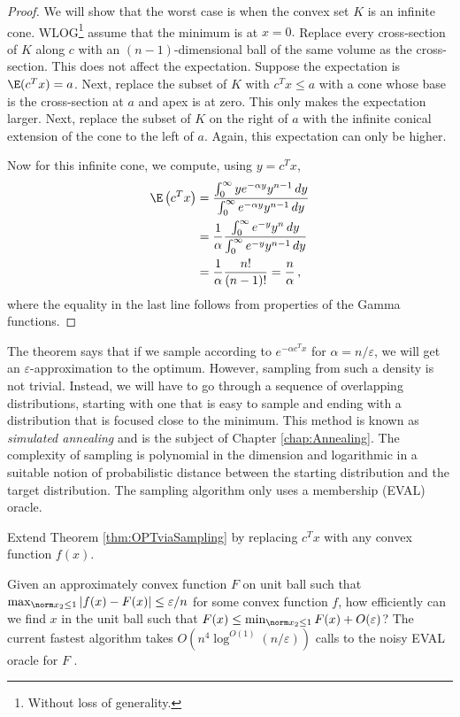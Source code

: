 \begin{proof}
We will show that the worst case is when the convex set $K$ is an
infinite cone. WLOG\footnote{Without loss of generality.} assume
that the minimum is at $x=0.$ Replace every cross-section of $K$
along $c$ with an $(n-1)$-dimensional ball of the same volume as
the cross-section. This does not affect the expectation. Suppose the
expectation is $\E(c^{T}x)=a$. Next, replace the subset of $K$ with
$c^{T}x\le a$ with a cone whose base is the cross-section at $a$
and apex is at zero. This only makes the expectation larger. Next,
replace the subset of $K$ on the right of $a$ with the infinite
conical extension of the cone to the left of $a$. Again, this expectation
can only be higher. 

Now for this infinite cone, we compute, using $y=c^{T}x$, 
\begin{align*}
\E\left(c^{T}x\right) & =\frac{\int_{0}^{\infty}ye^{-\alpha y}y^{n-1}\,dy}{\int_{0}^{\infty}e^{-\alpha y}y^{n-1}\,dy}\\
 & =\frac{1}{\alpha}\frac{\int_{0}^{\infty}e^{-y}y^{n}\,dy}{\int_{0}^{\infty}e^{-y}y^{n-1}\,dy}\\
 & =\frac{1}{\alpha}\frac{n!}{(n-1)!}=\frac{n}{\alpha}\,,
\end{align*}
where the equality in the last line follows from properties of the
Gamma functions.
\end{proof}
The theorem says that if we sample according to $e^{-\alpha c^{T}x}$
for $\alpha=n/\varepsilon$, we will get an $\varepsilon$-approximation
to the optimum. However, sampling from such a density is not trivial.
Instead, we will have to go through a sequence of overlapping distributions,
starting with one that is easy to sample and ending with a distribution
that is focused close to the minimum. This method is known as \emph{simulated
annealing }and is the subject of Chapter \ref{chap:Annealing}. The
complexity of sampling is polynomial in the dimension and logarithmic
in a suitable notion of probabilistic distance between the starting
distribution and the target distribution. The sampling algorithm only
uses a membership (EVAL) oracle.
\begin{xca}
Extend Theorem \ref{thm:OPTviaSampling} by replacing $c^{T}x$ with
any convex function $f(x)$.
\end{xca}

\begin{problem*}
Given an approximately convex function $F$ on unit ball such that
$\max_{\norm x_{2}\leq1}|f(x)-F(x)|\leq\varepsilon/n$ for some convex
function $f$, how efficiently can we find $x$ in the unit ball such
that $F(x)\leq\min_{\norm x_{2}\leq1}F(x)+O(\varepsilon)$? The current
fastest algorithm takes $O(n^{4}\log^{O(1)}(n/\varepsilon))$ calls
to the noisy EVAL oracle for $F$ .
\end{problem*}

